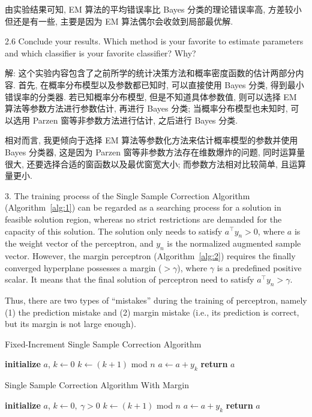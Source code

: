 \documentclass[openany]{ctexbook}
\theoremstyle{kaiti}
\theoremstyle{normal}
\begin{document}
由实验结果可知, EM 算法的平均错误率比 Bayes 分类的理论错误率高, 方差较小但还是有一些, 主要是因为 EM 算法偶尔会收敛到局部最优解.

2.6 Conclude your results. Which method is your favorite to estimate parameters and which classifier is your favorite classifier? Why?

解: 这个实验内容包含了之前所学的统计决策方法和概率密度函数的估计两部分内容. 首先, 在概率分布模型以及参数都已知时, 可以直接使用 Bayes 分类, 得到最小错误率的分类器. 若已知概率分布模型, 但是不知道具体参数值, 则可以选择 EM 算法等参数方法进行参数估计, 再进行 Bayes 分类; 当概率分布模型也未知时, 可以选用 Parzen 窗等非参数方法进行估计, 之后进行 Bayes 分类.

相对而言, 我更倾向于选择 EM 算法等参数化方法来估计概率模型的参数并使用 Bayes 分类器, 这是因为 Parzen 窗等非参数方法存在维数爆炸的问题, 同时运算量很大, 还要选择合适的窗函数以及最优窗宽大小; 而参数方法相对比较简单, 且运算量更小.

3. The training process of the Single Sample Correction Algorithm (Algorithm~\ref{alg:1}) can be regarded as a searching process for a solution in feasible solution region, whereas no strict restrictions are demanded for the capacity of this solution. The solution only needs to satisfy $a^{\top}y_n>0$, where $a$ is the weight vector of the perceptron, and $y_n$ is the normalized augmented sample vector. However, the margin perceptron (Algorithm~\ref{alg:2}) requires the finally converged hyperplane possesses a margin ($>\gamma$), where $\gamma$ is a predefined positive scalar. It means that the final solution of perceptron need to satisfy $a^{\top}y_n>\gamma$.

Thus, there are two types of ``mistakes'' during the training of perceptron, namely (1) the prediction mistake and (2) margin mistake (i.e., its prediction is correct, but its margin is not large enough).

\begin{algorithm}[htb]
  \caption{Fixed-Increment Single Sample Correction Algorithm}
  \label{alg:1}
  \begin{algorithmic}[1]
  \STATE \textbf{initialize} $a$, $k\gets0$
  \REPEAT
    \STATE $k\gets(k+1)$ mod $n$
        \STATE $a\gets a+y_k$
    \ENDIF
  \STATE \textbf{return} $a$
  \end{algorithmic}
\end{algorithm}

\begin{algorithm}[htb]
  \caption{Single Sample Correction Algorithm With Margin}
  \label{alg:2}
  \begin{algorithmic}[1]
  \STATE \textbf{initialize} $a$, $k\gets0,~\gamma>0$
  \REPEAT
    \STATE $k\gets(k+1)$ mod $n$
        \STATE $a\gets a+y_k$
    \ENDIF
  \STATE \textbf{return} $a$
  \end{algorithmic}
\end{algorithm}
\end{document}
